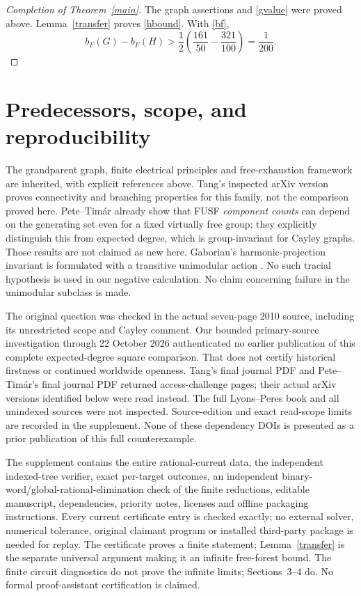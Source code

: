 \documentclass[11pt]{article}
\theoremstyle{remark}\newtheorem{remark}[theorem]{Remark}
\begin{document}
\begin{proof}[Completion of Theorem~\ref{main}]
The graph assertions and \eqref{gvalue} were proved above.
Lemma~\ref{transfer} proves \eqref{hbound}. With \eqref{bf},
\[
 b_F(G)-b_F(H)
 >\frac12\left(\frac{161}{50}-\frac{321}{100}\right)=\frac1{200}.
\]
\end{proof}

\section{Predecessors, scope, and reproducibility}
The grandparent graph, finite electrical principles and free-exhaustion
framework are inherited, with explicit references above.
Tang's inspected arXiv version proves connectivity and branching
properties for this family, not the comparison proved here.
Pete--Tim\'ar \cite[Theorems~1.1--1.2]{PT} already show that FUSF
\emph{component counts} can depend on the generating set even for a
fixed virtually free group; they explicitly distinguish this from
expected degree, which is group-invariant for Cayley graphs.
Those results are not claimed as new here.
Gaboriau's harmonic-projection invariant is formulated with a
transitive unimodular action \cite[\S2.4]{Gab}.
No such tracial hypothesis is used in our negative calculation.
No claim concerning failure in the unimodular subclass is made.

The original question was checked in the actual seven-page 2010 source,
including its unrestricted scope and Cayley comment.
Our bounded primary-source investigation through 22 October 2026
authenticated no earlier publication of this complete expected-degree
square comparison. That does not certify historical firstness or
continued worldwide openness.
Tang's final journal PDF and Pete--Tim\'ar's final journal PDF returned
access-challenge pages; their actual arXiv versions identified below
were read instead. The full Lyons--Peres book and all unindexed sources
were not inspected. Source-edition and exact read-scope limits are
recorded in the supplement. None of these dependency DOIs is presented
as a prior publication of this full counterexample.

The supplement contains the entire rational-current data, the independent
indexed-tree verifier, exact per-target outcomes, an independent
binary-word/global-rational-elimination check of the finite reductions,
editable manuscript, dependencies, priority notes, licenses and
offline packaging instructions.
Every current certificate entry is checked exactly; no external solver,
numerical tolerance, original claimant program or installed third-party
package is needed for replay.
The certificate proves a finite statement; Lemma~\ref{transfer} is the
separate universal argument making it an infinite free-forest bound.
The finite circuit diagnostics do not prove the infinite limits;
Sections~3--4 do. No formal proof-assistant certification is claimed.
\end{document}
